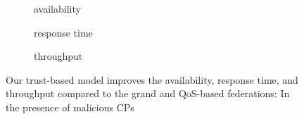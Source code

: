 \documentclass[preprint]{elsarticle}
\theoremstyle{definition}
\theoremstyle{remark}
\theoremstyle{property}
\begin{document}
\begin{figure}[!ht]
\centering
\begin{subfigure}{\textwidth}
\centering
{}
\caption{availability}
\end{subfigure}
\qquad\qquad
\begin{subfigure}{\textwidth}
\centering
{}
\caption{response time}
\end{subfigure}
\qquad\qquad
\begin{subfigure}{\textwidth}
\centering
{}
\caption{throughput}
\end{subfigure}
\qquad\qquad
\caption{Our trust-based model improves the availability, response time, and throughput compared to the grand and QoS-based federations: In the presence of malicious CPs}
\end{figure}
\end{document}

